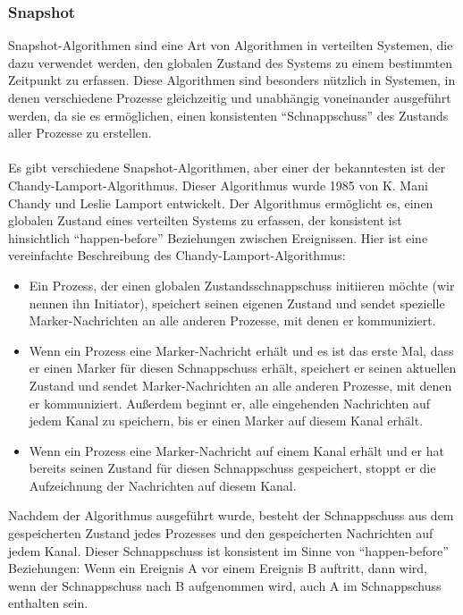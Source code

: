 \subsubsection{Snapshot}

Snapshot-Algorithmen sind eine Art von Algorithmen in verteilten Systemen, die dazu verwendet werden, den globalen Zustand des Systems zu einem bestimmten Zeitpunkt zu erfassen. Diese Algorithmen sind besonders nützlich in Systemen, in denen verschiedene Prozesse gleichzeitig und unabhängig voneinander ausgeführt werden, da sie es ermöglichen, einen konsistenten \enquote{Schnappschuss} des Zustands aller Prozesse zu erstellen.
\\\\
Es gibt verschiedene Snapshot-Algorithmen, aber einer der bekanntesten ist der Chandy-Lamport-Algorithmus. Dieser Algorithmus wurde 1985 von K. Mani Chandy und Leslie Lamport entwickelt. Der Algorithmus ermöglicht es, einen globalen Zustand eines verteilten Systems zu erfassen, der konsistent ist hinsichtlich \enquote{happen-before} Beziehungen zwischen Ereignissen. Hier ist eine vereinfachte Beschreibung des Chandy-Lamport-Algorithmus:
\begin{itemize}
\item Ein Prozess, der einen globalen Zustandsschnappschuss initiieren möchte (wir nennen ihn Initiator), speichert seinen eigenen Zustand und sendet spezielle Marker-Nachrichten an alle anderen Prozesse, mit denen er kommuniziert.
\item Wenn ein Prozess eine Marker-Nachricht erhält und es ist das erste Mal, dass er einen Marker für diesen Schnappschuss erhält, speichert er seinen aktuellen Zustand und sendet Marker-Nachrichten an alle anderen Prozesse, mit denen er kommuniziert. Außerdem beginnt er, alle eingehenden Nachrichten auf jedem Kanal zu speichern, bis er einen Marker auf diesem Kanal erhält.
\item Wenn ein Prozess eine Marker-Nachricht auf einem Kanal erhält und er hat bereits seinen Zustand für diesen Schnappschuss gespeichert, stoppt er die Aufzeichnung der Nachrichten auf diesem Kanal.
\end{itemize} 
Nachdem der Algorithmus ausgeführt wurde, besteht der Schnappschuss aus dem gespeicherten Zustand jedes Prozesses und den gespeicherten Nachrichten auf jedem Kanal. Dieser Schnappschuss ist konsistent im Sinne von \enquote{happen-before} Beziehungen: Wenn ein Ereignis A vor einem Ereignis B auftritt, dann wird, wenn der Schnappschuss nach B aufgenommen wird, auch A im Schnappschuss enthalten sein.

